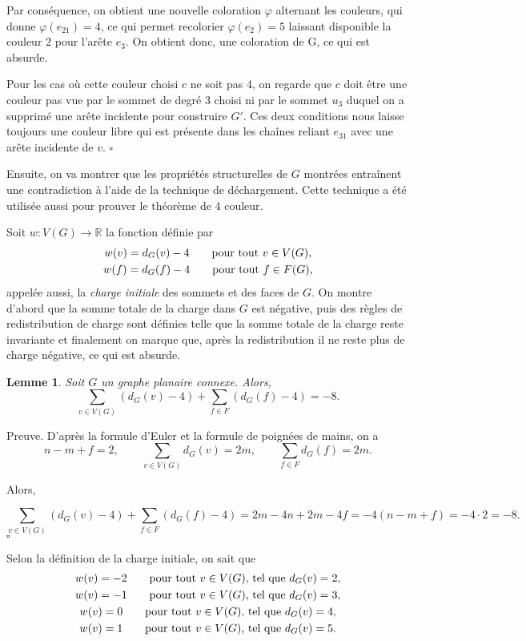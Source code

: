 \documentclass[10pt,a4paper]{article}
\newtheorem{lemme}{Lemme}
\newcommand{\ep}{{\hfill $\square$}}
\begin{document}
Par conséquence, on obtient une nouvelle coloration $\varphi$ alternant les couleurs, qui donne $\varphi(e_{21}) = 4$, ce qui permet recolorier $\varphi(e_2) = 5$ laissant disponible la couleur $2$ pour l'arête $e_3$. On obtient donc, une coloration de G, ce qui est absurde.

Pour les cas où cette couleur choisi $c$ ne soit pas 4, on regarde que $c$ doit être une couleur pas vue par le sommet de degré 3 choisi ni par le sommet $u_3$ duquel on a supprimé une arête incidente pour construire $G'$. Ces deux conditions nous laisse toujours une couleur libre qui est présente dans les chaînes reliant $e_{31}$ avec une arête incidente de $v$.
\ep


\bigskip
Ensuite, on va montrer que les propriétés structurelles de $G$ montrées entraînent une contradiction à l'aide de la technique de déchargement. Cette technique a été utilisée aussi pour prouver le théorème de 4 couleur. 

Soit $w: V(G) \to \mathbb{R}$  la fonction définie par
 $$
 \gathered
 w(v) = d_G(v) - 4 \qquad \textrm{pour tout $v\in V(G)$,} \\
 w(f) = d_G(f) - 4 \qquad \textrm{pour tout $f\in F(G)$,} 
\endgathered 
$$
appelée aussi, la \emph{charge initiale} des sommets et des faces de $G$. On montre d'abord que la somme totale de la charge dans $G$ est négative, puis des règles de redistribution de charge sont définies telle que la somme totale de la charge reste invariante et finalement on marque que, après la redistribution il ne reste plus de charge négative, ce qui est absurde.

\begin{lemme}
Soit $G$ un graphe planaire connexe. Alors,
$$ \sum_{v \in V(G)} (d_G(v) - 4) + \sum_{f\in F} (d_G(f) -4) = -8.$$
\label{le:charge}
\end{lemme}

Preuve.
D'après la formule d'Euler et la formule de poignées de mains, on a
$$ 
n - m + f = 2, \qquad
\sum_{v\in V(G)} d_G(v) = 2m, \qquad
\sum_{f\in F} d_G(f) = 2m. 
$$

Alors,

$$ \sum_{v \in V(G)} (d_G(v) - 4) + \sum_{f\in F} (d_G(f) -4) = 2m -4n + 2m - 4f = -4(n - m + f) = -4\cdot 2 = -8.$$
\ep 

Selon la définition de la charge initiale, on sait que
$$ 
\gathered
w(v) = -2 \qquad \textrm{pour tout $v \in V(G)$, tel que } d_G(v) = 2, \\
w(v) = -1 \qquad \textrm{pour tout $v \in V(G)$, tel que } d_G(v) = 3, \\
w(v) =  0 \qquad \textrm{pour tout $v \in V(G)$, tel que } d_G(v) = 4, \\
w(v) =  1 \qquad \textrm{pour tout $v \in V(G)$, tel que } d_G(v) = 5.
\endgathered
$$
\end{document}

